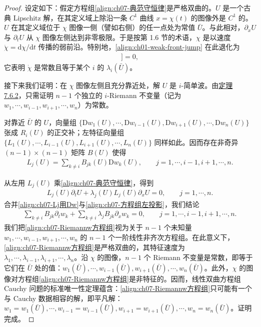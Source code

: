 \documentclass[../../main.tex]{subfiles}
\begin{document}
\begin{proof}
设定如下：假定方程组\eqref{align:ch07-典范守恒律}是严格双曲的。$U$ 是一个古典 Lipschitz 解，在其定义域上除沿一条 $C^1$ 曲线 $x=\chi(t)$ 的图像外是 $C^1$ 的。$U$ 在其定义域位于 $\chi$ 图像一侧（譬如右侧）的任一点处为常值 $\bar{U}$。与此相对，$\partial_x U$ 与 $\partial_t U$ 从 $\chi$ 图像左侧达到非零极限。于是按第 1.6 节的术语，$\chi$ 是以速度 $\dot{\chi}=\mathrm{d}\chi/\mathrm{d}t$ 传播的弱前沿。特别地，\eqref{align:ch01-weak-front-jump}
在此退化为
\begin{align}
[\mathrm{D}F(\bar{U})-\dot{\chi}I][[\partial U/\partial\mathcal{N}]]=0,
\label{align:ch07-弱前沿Lax}
\end{align}
它表明 $\dot{\chi}$ 是常数且等于某个 $i$ 的 $\lambda_i(\bar{U})$。

接下来我们证明：在 $\chi$ 图像左侧且充分靠近处，解 $U$ 是 $i$-简单波。由\hyperref[theorem:ch07-简单波Riemann判据]{定理 7.6.2}，只需证明 $n-1$ 个独立的 $i$-Riemann 不变量（记为 $w_1,\cdots,w_{i-1},w_{i+1},\cdots,w_n$）为常数。

对靠近 $\bar{U}$ 的 $U$，向量组 $\{\mathrm{D}w_1(U),\cdots,\mathrm{D}w_{i-1}(U),\mathrm{D}w_{i+1}(U),\cdots,\mathrm{D}w_n(U)\}$ 张成 $R_i(U)$ 的正交补；左特征向量组 $\{L_1(U),\cdots,L_{i-1}(U),L_{i+1}(U),\cdots,L_n(U)\}$ 同样如此。因而存在非奇异 $(n-1)\times(n-1)$ 矩阵 $B(U)$ 使得
\begin{align}
L_j(U)=\sum_{k\neq i}B_{jk}(U)\mathrm{D}w_k(U),\qquad j=1,\cdots,i-1,i+1,\cdots,n.
\label{align:ch07-Lj用Dw}
\end{align}

从左用 $L_j(U)$ 乘\eqref{align:ch07-典范守恒律}，得到
\begin{align}
L_j(U)\partial_t U+\lambda_j(U)L_j(U)\partial_x U=0,\qquad j=1,\cdots,n.
\label{align:ch07-方程组左投影}
\end{align}
合并\eqref{align:ch07-Lj用Dw}与\eqref{align:ch07-方程组左投影}，我们结论
\begin{align}
\sum_{k\neq i}B_{jk}\partial_t w_k+\sum_{k\neq i}\lambda_j B_{jk}\partial_x w_k=0,\qquad j=1,\cdots,i-1,i+1,\cdots,n.
\label{align:ch07-Riemannw方程组}
\end{align}
我们把\eqref{align:ch07-Riemannw方程组}视为关于 $n-1$ 个未知量 $w_1,\cdots,w_{i-1},w_{i+1},\cdots,w_n$ 的 $n-1$ 个一阶线性非齐次方程组。在此意义下，\eqref{align:ch07-Riemannw方程组}是严格双曲的，其特征速度为 $\lambda_1,\cdots,\lambda_{i-1},\lambda_{i+1},\cdots,\lambda_n$。沿 $\chi$ 的图像，$n-1$ 个 Riemann 不变量是常数，即等于它们在 $\bar{U}$ 处的值：$w_1(\bar{U}),\cdots,w_{i-1}(\bar{U}),w_{i+1}(\bar{U}),\cdots,w_n(\bar{U})$。此外，$\chi$ 的图像对方程组\eqref{align:ch07-Riemannw方程组}是非特征的。因而，线性双曲方程组 Cauchy 问题的标准唯一性定理蕴含：\eqref{align:ch07-Riemannw方程组}只可能有一个与 Cauchy 数据相容的解，即平凡解：
$w_1=w_1(\bar{U}),\cdots,w_{i-1}=w_{i-1}(\bar{U}),w_{i+1}=w_{i+1}(\bar{U}),\cdots,w_n=w_n(\bar{U})$。证明完成。
\end{proof}
\end{document}
